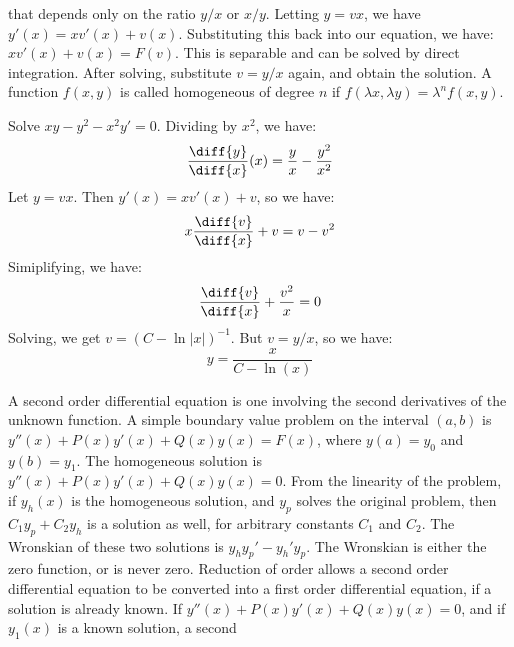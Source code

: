         that depends only on the ratio $y/x$ or $x/y$.
        Letting $y=vx$, we have $y'(x)=xv'(x)+v(x)$.
        Substituting this back into our equation, we have:
        $xv'(x)+v(x)=F(v)$. This is separable and can be solved
        by direct integration. After solving, substitute
        $v=y/x$ again, and obtain the solution. A function $f(x,y)$
        is called homogeneous of degree $n$ if
        $f(\lambda{x},\lambda{y})=\lambda^{n}f(x,y)$.
        \begin{example}
            Solve $xy-y^{2}-x^{2}y'=0$. Dividing by $x^{2}$,
            we have:
            \begin{equation*}
                \frac{\diff{y}}{\diff{x}}(x)
                =\frac{y}{x}-\frac{y^{2}}{x^{2}}
            \end{equation*}
            Let $y=vx$. Then $y'(x)=xv'(x)+v$, so we have:
            \begin{equation*}
                x\frac{\diff{v}}{\diff{x}}+v=v-v^{2}
            \end{equation*}
            Simiplifying, we have:
            \begin{equation*}
                \frac{\diff{v}}{\diff{x}}+\frac{v^{2}}{x}=0
            \end{equation*}
            Solving, we get $v=(C-\ln|x|)^{-1}$.
            But $v=y/x$, so we have:
            \begin{equation*}
                y=\frac{x}{C-\ln(x)}
            \end{equation*}
        \end{example}
        A second order differential equation is one involving
        the second derivatives of the unknown function. A simple
        boundary value problem on the interval $(a,b)$ is
        $y''(x)+P(x)y'(x)+Q(x)y(x)=F(x)$, where
        $y(a)=y_{0}$ and $y(b)=y_{1}$. The homogeneous solution
        is $y''(x)+P(x)y'(x)+Q(x)y(x)=0$. From the linearity of
        the problem, if $y_{h}(x)$ is the homogeneous solution,
        and $y_{p}$ solves the original problem, then
        $C_{1}y_{p}+C_{2}y_{h}$ is a solution as well, for
        arbitrary constants $C_{1}$ and $C_{2}$. The Wronskian
        of these two solutions is $y_{h}y_{p}'-y_{h}'y_{p}$.
        The Wronskian is either the zero function, or is
        never zero. Reduction of order allows a second order
        differential equation to be converted into a first
        order differential equation, if a solution is already
        known. If $y''(x)+P(x)y'(x)+Q(x)y(x)=0$, and if
        $y_{1}(x)$ is a known solution, a second

